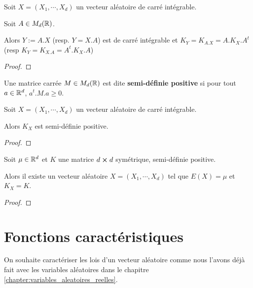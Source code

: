 \begin{proposition}
	Soit $X = (X_{1}, \cdots, X_{d})$ un vecteur aléatoire de carré intégrable.

	Soit $A \in M_{d}(\mathbb{R})$.

	Alors $Y := A . X$ (resp. $Y = X . A$) est de carré intégrable et $K_{Y} =
	K_{A . X} = A . K_{X} . A^{t}$ (resp $K_{Y} = K_{X . A} = A^{t} . K_{X} . A$)
\end{proposition}

\ifdefined\outputproof
\begin{proof}

\end{proof}

\begin{definition}
	Une matrice carrée $M \in M_{d}(\mathbb{R})$ est dite
	\textbf{semi-définie positive} si pour tout $a \in \mathbb{R}^{d}$, $a^{t} . M .
	a \geq 0$.
\end{definition}

\begin{proposition}
	Soit $X = (X_{1}, \cdots, X_{d})$ un vecteur aléatoire de carré intégrable.

	Alors $K_{X}$ est semi-définie positive.
\end{proposition}

\ifdefined\outputproof
\begin{proof}

\end{proof}

\begin{theorem}
	Soit $\mu \in \mathbb{R}^{d}$ et $K$ une matrice $d \cross d$ symétrique,
	semi-définie positive.

	Alors il existe un vecteur aléatoire $X = (X_{1}, \cdots, X_{d})$ tel que
	$E(X) = \mu$ et $K_{X} = K$.
\end{theorem}

\ifdefined\outputproof
\begin{proof}

\end{proof}


\section{Fonctions caractéristiques}

On souhaite caractériser les lois d'un vecteur aléatoire comme nous l'avons déjà
fait avec les variables aléatoires dans le chapitre
\ref{chapter:variables_aleatoires_reelles}.

